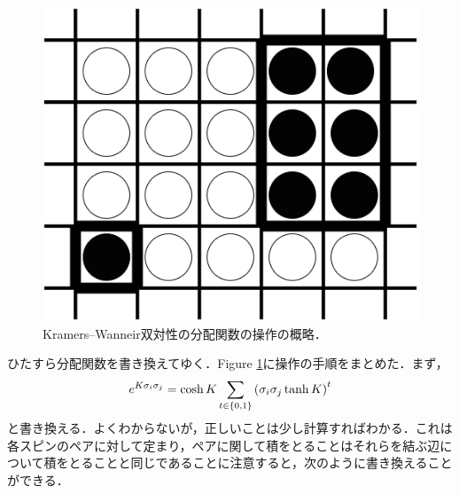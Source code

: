 \begin{figure}[thbp]
\begin{minipage}[t]{0.32\linewidth}
		\end{minipage}
		\begin{minipage}[t]{0.32\linewidth}
				\centering
				\includegraphics[keepaspectratio, scale=0.3]{./doc/img/KW_duality-Page-3.drawio.png}
		\end{minipage}
		\caption{Kramers--Wanneir双対性の分配関数の操作の概略．}
		\label{fig:KW_load}
\end{figure}


	ひたすら分配関数を書き換えてゆく．Figure \ref{fig:KW_load}に操作の手順をまとめた．まず，
	\begin{equation}
			e^{K\sigma_i \sigma_j} = \cosh K \sum_{t\in\qty{0, 1}}\qty(\sigma_i \sigma_j \tanh K)^t
	\end{equation}
	と書き換える．よくわからないが，正しいことは少し計算すればわかる．これは各スピンのペアに対して定まり，ペアに関して積をとることはそれらを結ぶ辺について積をとることと同じであることに注意すると，次のように書き換えることができる．

